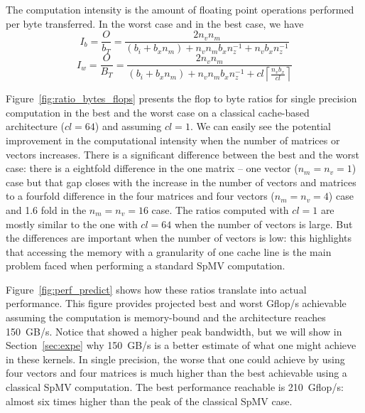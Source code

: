 \documentclass[10pt,conference,compsocconf]{IEEEtran}
\newcommand{\ceil}[1]{\left\lceil#1\right\rceil}
\begin{document}
The computation intensity is the amount of floating point operations performed per
byte transferred. In the worst case and in the best case, we have
$$I_b = \frac{O}{b_T} = \frac{2 n_v n_m}{ (b_i + b_x n_m) + n_v n_m b_x n_z^{-1} + n_v b_x n_z^{-1} }$$
$$I_w = \frac{O}{B_T} = \frac{2 n_v n_m}{(b_i+b_x n_m) + n_v n_m b_x n_z^{-1} + cl \ceil{\frac{n_vb_x}{cl}} }$$


Figure~\ref{fig:ratio_bytes_flops} presents the flop to byte ratios
for single precision computation in the best and the worst case on a
classical cache-based architecture ($cl = 64$) and assuming $cl=1$. We
can easily see the potential improvement in the computational
intensity when the number of matrices or vectors increases. There is a
significant difference between the best and the worst case: there is a
eightfold difference in the one matrix -- one vector ($n_m=n_v=1$) case but that gap closes
with the increase in the number of vectors and matrices to a fourfold
difference in the four matrices and four vectors ($n_m=n_v=4$) case and 1.6 fold in the 
$n_m=n_v=16$ case. 
The ratios computed with $cl = 1$ are mostly
similar to the one with $cl=64$ when the number of vectors is
large. But the differences are important when the number of vectors is
low: this highlights that accessing the memory with a granularity of one cache
line is the main problem faced when performing a standard SpMV computation.

Figure~\ref{fig:perf_predict} shows how these ratios translate
into actual performance. This figure provides projected best and worst
Gflop/s achievable assuming the computation is memory-bound and the
architecture reaches 150~GB/s. Notice that \cite{Saule13-ARXIV}
showed a higher peak bandwidth, but we will show in
Section~\ref{sec:expe} why 150~GB/s is a better estimate of what one
might achieve in these kernels. In single precision, the worse that
one could achieve by using four vectors and four matrices is much higher
than the best achievable using a classical SpMV computation. The best
performance reachable is 210~Gflop/s: almost six times higher than the
peak of the classical SpMV case. 
\end{document}
